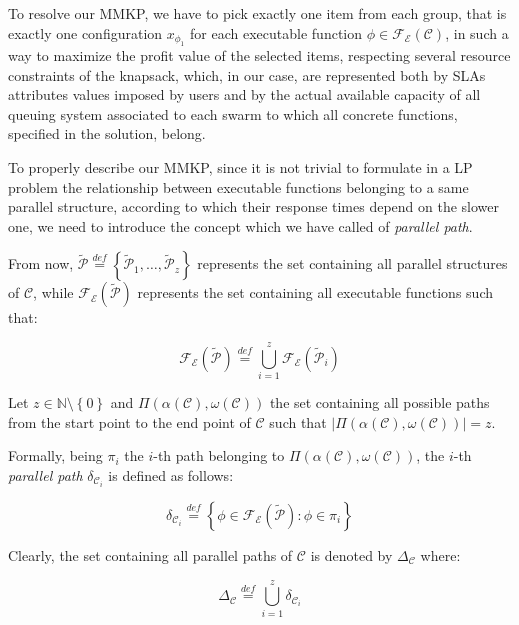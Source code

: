 \documentclass[12pt,a4paper]{report}
\newcommand{\mathDef}{\overset{\textit{def}}{=}}
\newcommand{\N}{\mathbb{N}}
\newcommand{\SetMinusZero}{\setminus \left\{0\right\}}
\begin{document}
To resolve our MMKP, we have to pick exactly one item from each group, that is exactly one configuration $x_{\phi_1}$ for each executable function $\phi \in \mathscr{F_E}(\mathcal{C})$, in such a way to maximize the profit value of the selected items, respecting several resource constraints of the knapsack, which, in our case, are represented both by SLAs attributes values imposed by users and by the actual available capacity of all queuing system associated to each swarm to which all concrete functions, specified in the solution, belong.

To properly describe our MMKP, since it is not trivial to formulate in a LP problem the relationship between executable functions belonging to a same parallel structure, according to which their response times depend on the slower one, we need to introduce the concept which we have called of \textit{parallel path}.

From now, $\mathcal{\widetilde{P}} \mathDef \left\{\mathcal{\widetilde{P}}_1,\ldots,\mathcal{\widetilde{P}}_z \right\}$ represents the set containing all parallel structures of $\mathcal{C}$, while $\mathscr{F_E}(\mathcal{\widetilde{P}})$ represents the set containing all executable functions such that:

\begin{equation}
\mathscr{F_E}(\mathcal{\widetilde{P}}) \mathDef \bigcup_{i=1}^z \mathscr{F_E}(\mathcal{\widetilde{P}}_i)
\end{equation}

Let $z \in \N \SetMinusZero$ and $\Pi(\alpha(\mathcal{C}),\omega(\mathcal{C}))$ the set containing all possible paths from the start point to the end point of $\mathcal{C}$ such that $|\Pi(\alpha(\mathcal{C}),\omega(\mathcal{C}))| = z$. 

Formally, being $\pi_i$ the $i$-th path belonging to $\Pi(\alpha(\mathcal{C}),\omega(\mathcal{C}))$, the $i$-th \textit{parallel path} $\delta_{\mathcal{C}_i}$ is defined as follows:

\begin{equation}
	\delta_{\mathcal{C}_i} \mathDef \left\{ \phi \in \mathscr{F_E}(\mathcal{\widetilde{P}}) : \phi \in \pi_i \right\}
\end{equation}

Clearly, the set containing all parallel paths of $\mathcal{C}$ is denoted by $\Delta_{\mathcal{C}}$ where: 

\begin{equation}
	\Delta_{\mathcal{C}} \mathDef \bigcup_{i=1}^z \delta_{\mathcal{C}_i}
\end{equation}
\end{document}
